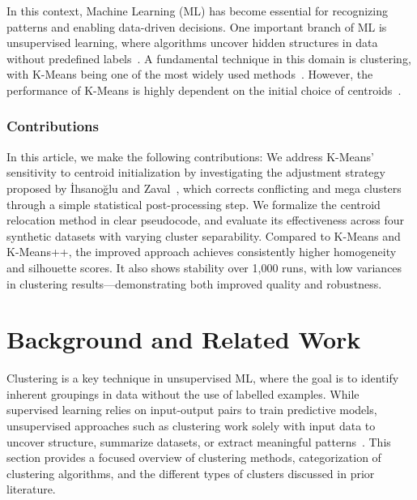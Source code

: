 \documentclass[10pt,twocolumn,letterpaper]{article}
\begin{document}
In this context, Machine Learning (ML) has become essential for recognizing
patterns and enabling data-driven decisions. One important branch of ML is
unsupervised learning, where algorithms uncover hidden structures in data
without predefined labels~\cite{deuschle2019}. A fundamental technique in this
domain is clustering, with K-Means being one of the most widely used
methods~\cite{Ezugwu2022104743,Jain2010651}. However, the performance of
K-Means is highly dependent on the initial choice of
centroids~\cite{FRANTI201995,Abdullah10601123}.

\subsubsection{Contributions}

In this article, we make the following contributions: We address K-Means’
sensitivity to centroid initialization by investigating the adjustment strategy
proposed by İhsanoğlu and Zaval~\cite{Abdullah10601123}, which corrects
conflicting and mega clusters through a simple statistical post-processing
step. We formalize the centroid relocation method in clear pseudocode, and
evaluate its effectiveness across four synthetic datasets with varying cluster
separability. Compared to K-Means and K-Means++, the improved approach achieves
consistently higher homogeneity and silhouette scores. It also shows stability
over 1,000 runs, with low variances in clustering results—demonstrating both
improved quality and robustness.


\section{Background and Related Work}\label{sec:background-and-related-work}


Clustering is a key technique in unsupervised ML, where the goal is to identify
inherent groupings in data without the use of labelled examples. While
supervised learning relies on input-output pairs to train predictive models,
unsupervised approaches such as clustering work solely with input data to
uncover structure, summarize datasets, or extract meaningful
patterns~\cite{deuschle2019}. This section provides a focused overview of
clustering methods, categorization of clustering algorithms, and the different
types of clusters discussed in prior literature.
\end{document}
